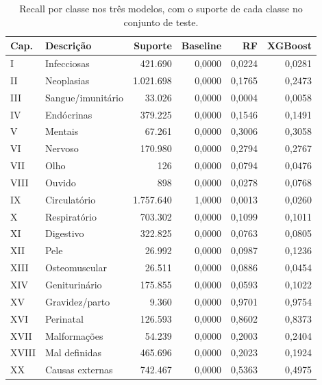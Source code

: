 \documentclass[12pt]{article}
\begin{document}
\begin{table}[ht]
\centering
\caption{Recall por classe nos três modelos, com o suporte de cada classe no
  conjunto de teste.}
\label{tab:recall}
\begin{tabular}{|l|l|r|r|r|r|}
\hline
\textbf{Cap.} & \textbf{Descrição} & \textbf{Suporte} & \textbf{Baseline}
  & \textbf{RF} & \textbf{XGBoost} \\
\hline
I     & Infecciosas       &   421.690 & 0,0000 & 0,0224 & 0,0281 \\
II    & Neoplasias        & 1.021.698 & 0,0000 & 0,1765 & 0,2473 \\
III   & Sangue/imunitário &    33.026 & 0,0000 & 0,0004 & 0,0058 \\
IV    & Endócrinas        &   379.225 & 0,0000 & 0,1546 & 0,1491 \\
V     & Mentais           &    67.261 & 0,0000 & 0,3006 & 0,3058 \\
VI    & Nervoso           &   170.980 & 0,0000 & 0,2794 & 0,2767 \\
VII   & Olho              &       126 & 0,0000 & 0,0794 & 0,0476 \\
VIII  & Ouvido            &       898 & 0,0000 & 0,0278 & 0,0768 \\
IX    & Circulatório      & 1.757.640 & 1,0000 & 0,0013 & 0,0260 \\
X     & Respiratório      &   703.302 & 0,0000 & 0,1099 & 0,1011 \\
XI    & Digestivo         &   322.825 & 0,0000 & 0,0763 & 0,0805 \\
XII   & Pele              &    26.992 & 0,0000 & 0,0987 & 0,1236 \\
XIII  & Osteomuscular     &    26.511 & 0,0000 & 0,0886 & 0,0454 \\
XIV   & Geniturinário     &   175.855 & 0,0000 & 0,0593 & 0,1022 \\
XV    & Gravidez/parto    &     9.360 & 0,0000 & 0,9701 & 0,9754 \\
XVI   & Perinatal         &   126.593 & 0,0000 & 0,8602 & 0,8373 \\
XVII  & Malformações      &    54.239 & 0,0000 & 0,2003 & 0,2404 \\
XVIII & Mal definidas     &   465.696 & 0,0000 & 0,2023 & 0,1924 \\
XX    & Causas externas   &   742.467 & 0,0000 & 0,5363 & 0,4975 \\
\hline
\end{tabular}
\end{table}
\end{document}
